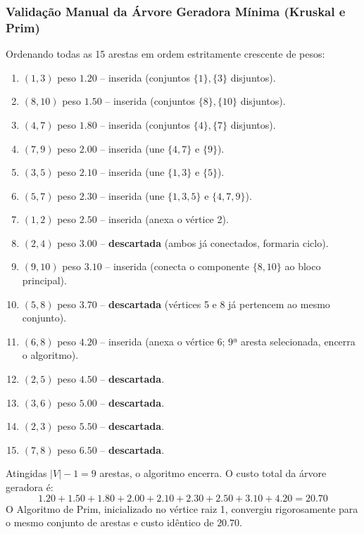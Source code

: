 \documentclass[12pt,a4paper]{article}
\begin{document}
\subsubsection*{Validação Manual da Árvore Geradora Mínima (Kruskal e Prim)}
Ordenando todas as 15 arestas em ordem estritamente crescente de pesos:
\begin{enumerate}
    \item $(1, 3)$ peso $1.20$ -- inserida (conjuntos $\{1\}, \{3\}$ disjuntos).
    \item $(8, 10)$ peso $1.50$ -- inserida (conjuntos $\{8\}, \{10\}$ disjuntos).
    \item $(4, 7)$ peso $1.80$ -- inserida (conjuntos $\{4\}, \{7\}$ disjuntos).
    \item $(7, 9)$ peso $2.00$ -- inserida (une $\{4, 7\}$ e $\{9\}$).
    \item $(3, 5)$ peso $2.10$ -- inserida (une $\{1, 3\}$ e $\{5\}$).
    \item $(5, 7)$ peso $2.30$ -- inserida (une $\{1, 3, 5\}$ e $\{4, 7, 9\}$).
    \item $(1, 2)$ peso $2.50$ -- inserida (anexa o vértice 2).
    \item $(2, 4)$ peso $3.00$ -- \textbf{descartada} (ambos já conectados, formaria ciclo).
    \item $(9, 10)$ peso $3.10$ -- inserida (conecta o componente $\{8, 10\}$ ao bloco principal).
    \item $(5, 8)$ peso $3.70$ -- \textbf{descartada} (vértices 5 e 8 já pertencem ao mesmo conjunto).
    \item $(6, 8)$ peso $4.20$ -- inserida (anexa o vértice 6; 9ª aresta selecionada, encerra o algoritmo).
    \item $(2, 5)$ peso $4.50$ -- \textbf{descartada}.
    \item $(3, 6)$ peso $5.00$ -- \textbf{descartada}.
    \item $(2, 3)$ peso $5.50$ -- \textbf{descartada}.
    \item $(7, 8)$ peso $6.50$ -- \textbf{descartada}.
\end{enumerate}
Atingidas $|V| - 1 = 9$ arestas, o algoritmo encerra. O custo total da árvore geradora é:
\begin{equation}
    1.20 + 1.50 + 1.80 + 2.00 + 2.10 + 2.30 + 2.50 + 3.10 + 4.20 = \mathbf{20.70}
\end{equation}
O Algoritmo de Prim, inicializado no vértice raiz 1, convergiu rigorosamente para o mesmo conjunto de arestas e custo idêntico de $20.70$.
\end{document}
